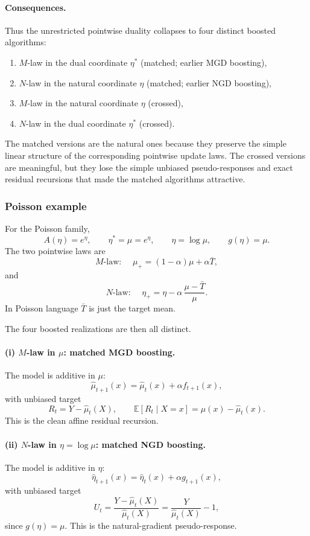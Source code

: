 \documentclass[11pt]{article}
\begin{document}
\paragraph{Consequences.}
Thus the unrestricted pointwise duality collapses to four distinct boosted algorithms:
\begin{enumerate}[leftmargin=2em]
\item \(M\)-law in the dual coordinate \(\eta^\ast\) (matched; earlier MGD boosting),
\item \(N\)-law in the natural coordinate \(\eta\) (matched; earlier NGD boosting),
\item \(M\)-law in the natural coordinate \(\eta\) (crossed),
\item \(N\)-law in the dual coordinate \(\eta^\ast\) (crossed).
\end{enumerate}
The matched versions are the natural ones because they preserve the simple linear structure of the corresponding pointwise update laws. The crossed versions are meaningful, but they lose the simple unbiased pseudo-responses and exact residual recursions that made the matched algorithms attractive.

\subsubsection{Poisson example}

For the Poisson family,
\[
A(\eta)=e^\eta,
\qquad
\eta^\ast=\mu=e^\eta,
\qquad
\eta=\log\mu,
\qquad
g(\eta)=\mu.
\]
The two pointwise laws are
\[
\text{\(M\)-law: }\quad
\mu_{+}=(1-\alpha)\mu+\alpha \bar T,
\]
and
\[
\text{\(N\)-law: }\quad
\eta_{+}
=
\eta-\alpha\,\frac{\mu-\bar T}{\mu}.
\]
In Poisson language \(\bar T\) is just the target mean.

The four boosted realizations are then all distinct.

\paragraph{(i) \(M\)-law in \(\mu\): matched MGD boosting.}
The model is additive in \(\mu\):
\[
\hat\mu_{t+1}(x)=\hat\mu_t(x)+\alpha f_{t+1}(x),
\]
with unbiased target
\[
R_t=Y-\hat\mu_t(X),
\qquad
\mathbb E[R_t\mid X=x]=\mu(x)-\hat\mu_t(x).
\]
This is the clean affine residual recursion.

\paragraph{(ii) \(N\)-law in \(\eta=\log\mu\): matched NGD boosting.}
The model is additive in \(\eta\):
\[
\hat\eta_{t+1}(x)=\hat\eta_t(x)+\alpha g_{t+1}(x),
\]
with unbiased target
\[
U_t=\frac{Y-\hat\mu_t(X)}{\hat\mu_t(X)}
=
\frac{Y}{\hat\mu_t(X)}-1,
\]
since \(g(\eta)=\mu\). This is the natural-gradient pseudo-response.
\end{document}
